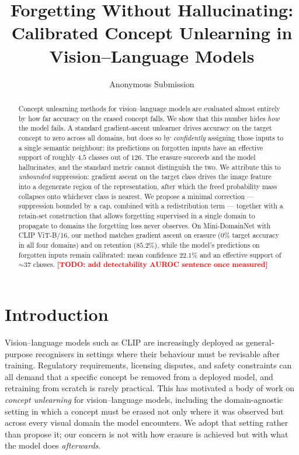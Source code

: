 \documentclass[10pt]{article}
\title{Forgetting Without Hallucinating:\\
Calibrated Concept Unlearning in Vision--Language Models}
\author{Anonymous Submission}
\date{}
\newcommand{\todo}[1]{\textcolor{red}{\textbf{[TODO: #1]}}}
\begin{document}
\maketitle

\begin{abstract}
Concept unlearning methods for vision--language models are evaluated almost
entirely by how far accuracy on the erased concept falls. We show that this
number hides \emph{how} the model fails. A standard gradient-ascent unlearner
drives accuracy on the target concept to zero across all domains, but does so by
\emph{confidently} assigning those inputs to a single semantic neighbour: its
predictions on forgotten inputs have an effective support of roughly
$4.5$ classes out of $126$. The erasure succeeds and the model hallucinates, and
the standard metric cannot distinguish the two.
We attribute this to \emph{unbounded} suppression: gradient ascent on the target
class drives the image feature into a degenerate region of the representation,
after which the freed probability mass collapses onto whichever class is
nearest. We propose a minimal correction --- suppression bounded by a cap,
combined with a redistribution term --- together with a retain-set construction
that allows forgetting supervised in a single domain to propagate to domains the
forgetting loss never observes. On Mini-DomainNet with CLIP ViT-B/16, our method
matches gradient ascent on erasure ($0\%$ target accuracy in all four domains)
and on retention ($85.2\%$), while the model's predictions on forgotten inputs
remain calibrated: mean confidence $22.1\%$ and an effective support of $\sim
37$ classes.
\todo{add detectability AUROC sentence once measured}
\end{abstract}

\section{Introduction}
\label{sec:intro}

Vision--language models such as CLIP are increasingly deployed as general-purpose
recognisers in settings where their behaviour must be revisable after training.
Regulatory requirements, licensing disputes, and safety constraints can all
demand that a specific concept be removed from a deployed model, and retraining
from scratch is rarely practical. This has motivated a body of work on
\emph{concept unlearning} for vision--language models, including the
domain-agnostic setting in which a concept must be erased not only where it was
observed but across every visual domain the model encounters. We adopt that
setting rather than propose it; our concern is not with how erasure is achieved
but with what the model does \emph{afterwards}.
\end{document}
